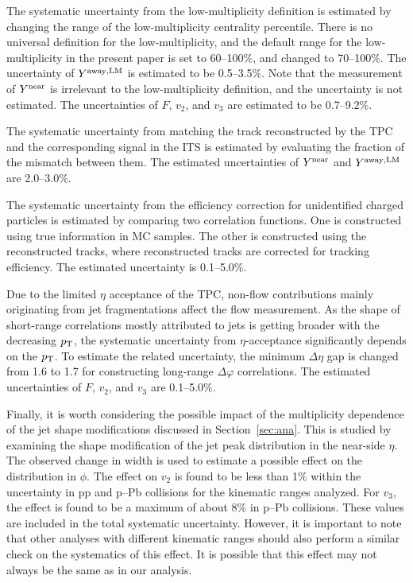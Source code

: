 The systematic uncertainty from the low-multiplicity definition is estimated by changing the range of the low-multiplicity centrality percentile. There is no universal definition for the low-multiplicity, and the default range for the low-multiplicity in the present paper is set to 60--100\%, and changed to 70--100\%. The uncertainty of $Y^{\rm{away,LM}}$ is estimated to be 0.5--3.5\%. Note that the measurement of $Y^{\rm{near}}$ is irrelevant to the low-multiplicity definition, and the uncertainty is not estimated. The uncertainties of $F$, $v_{2}$, and $v_{3}$ are estimated to be 0.7--9.2\%.

The systematic uncertainty from matching the track reconstructed by the TPC and the corresponding signal in the ITS is estimated by evaluating the fraction of the mismatch between them. The estimated uncertainties of $Y^{\rm{near}}$ and $Y^{\rm{away,LM}}$ are 2.0--3.0\%.

The systematic uncertainty from the efficiency correction for unidentified charged particles is estimated by comparing two correlation functions. One is constructed using true information in MC samples. The other is constructed using the reconstructed tracks, where reconstructed tracks are corrected for tracking efficiency. The estimated uncertainty is 0.1--5.0\%.

Due to the limited $\eta$ acceptance of the TPC, non-flow contributions mainly originating from jet fragmentations affect the flow measurement. As the shape of short-range correlations mostly attributed to jets is getting broader with the decreasing $p_\mathrm{T}$, the systematic uncertainty from $\eta$-acceptance significantly depends on the $p_{\rm{T}}$. To estimate the related uncertainty, the minimum $\Delta\eta$ gap is changed from 1.6 to 1.7 for constructing long-range $\Delta\varphi$ correlations.  The estimated uncertainties of $F$, $v_{2}$, and $v_{3}$ are 0.1--5.0\%.

Finally, it is worth considering the possible impact of the multiplicity dependence of the jet shape modifications discussed in Section~\ref{sec:ana}. This is studied by examining the shape modification of the jet peak distribution in the near-side $\eta$. The observed change in width is used to estimate a possible effect on the distribution in $\phi$. The effect on $v_2$ is found to be less than 1$\%$ within the uncertainty in pp and p--Pb collisions for the kinematic ranges analyzed. For $v_3$, the effect is found to be a maximum of about 8$\%$ in p--Pb collisions. These values are included in the total systematic uncertainty. However, it is important to note that other analyses with different kinematic ranges should also perform a similar check on the systematics of this effect. It is possible that this effect may not always be the same as in our analysis.




